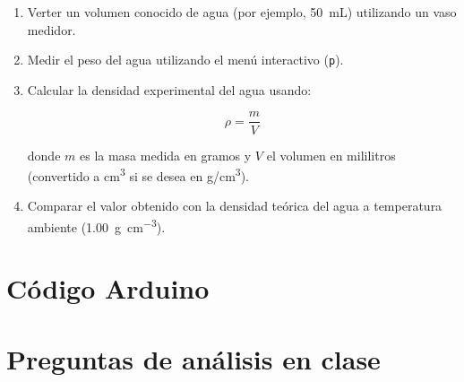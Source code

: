 \begin{enumerate}
\begin{enumerate}
    \item Verter un volumen conocido de agua (por ejemplo, \SI{50}{\milli\liter}) utilizando un vaso medidor.
  
    \item Medir el peso del agua utilizando el menú interactivo (\texttt{p}).
  
    \item Calcular la densidad experimental del agua usando:
  
  \[
  \rho = \frac{m}{V}
  \]

  donde $m$ es la masa medida en gramos y $V$ el volumen en mililitros (convertido a cm\textsuperscript{3} si se desea en g/cm\textsuperscript{3}).
  
    \item Comparar el valor obtenido con la densidad teórica del agua a temperatura ambiente (\SI{1.00}{\gram\per\centi\meter\cubed}).

  \end{enumerate}

  \end{enumerate}




\section*{Código Arduino}




\section*{Preguntas de análisis en clase}


